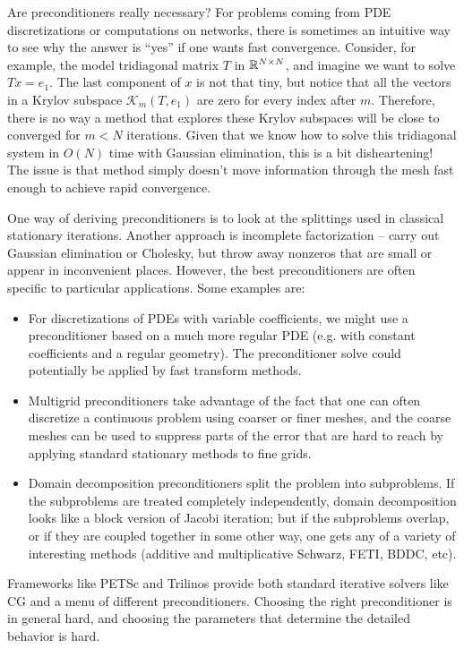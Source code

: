 \documentclass[12pt, leqno]{article}
\newcommand{\calK}{\mathcal{K}}
\begin{document}
Are preconditioners really necessary?  For problems coming from PDE
discretizations or computations on networks, there is sometimes an
intuitive way to see why the answer is ``yes'' if one wants fast
convergence.  Consider, for example, the model tridiagonal matrix $T$
in $\mathbb{R}^{N \times N}$, and imagine we want to solve $Tx = e_1$.  The
last component of $x$ is not that tiny, but notice that all the
vectors in a Krylov subspace $\calK_m(T, e_1)$ are zero for every
index after $m$.  Therefore, there is no way a method that explores
these Krylov subspaces will be close to converged for $m < N$
iterations.  Given that we know how to solve this tridiagonal system
in $O(N)$ time with Gaussian elimination, this is a bit disheartening!
The issue is that method simply doesn't move information through the
mesh fast enough to achieve rapid convergence.

One way of deriving preconditioners is to look at the splittings used
in classical stationary iterations.  Another approach is incomplete
factorization -- carry out Gaussian elimination or Cholesky, but
throw away nonzeros that are small or appear in inconvenient places.
However, the best preconditioners are often specific to particular
applications.  Some examples are:
\begin{itemize}
\item
  For discretizations of PDEs with variable coefficients, we might use
  a preconditioner based on a much more regular PDE (e.g. with
  constant coefficients and a regular geometry).  The preconditioner
  solve could potentially be applied by fast transform methods.
\item
  Multigrid preconditioners take advantage of the fact that one can
  often discretize a continuous problem using coarser or finer meshes,
  and the coarse meshes can be used to suppress parts of the error
  that are hard to reach by applying standard stationary methods to
  fine grids.
\item
  Domain decomposition preconditioners split the problem into
  subproblems.  If the subproblems are treated completely
  independently, domain decomposition looks like a block version of
  Jacobi iteration; but if the subproblems overlap, or if they are
  coupled together in some other way, one gets any of a variety of
  interesting methods (additive and multiplicative Schwarz, FETI,
  BDDC, etc).
\end{itemize}
Frameworks like PETSc and Trilinos provide both standard iterative
solvers like CG and a menu of different preconditioners.  Choosing the
right preconditioner is in general hard, and choosing the parameters
that determine the detailed behavior is hard.
\end{document}
